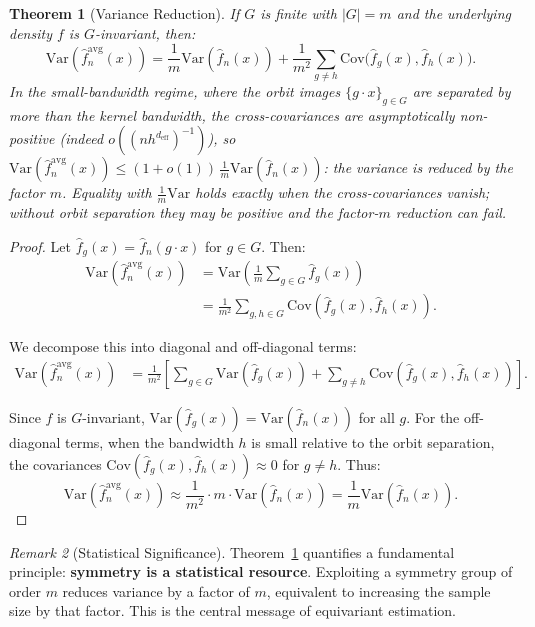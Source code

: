 \documentclass[11pt,twoside,openright]{book}
\theoremstyle{plain}
\newtheorem{theorem}{Theorem}[chapter]
\theoremstyle{definition}
\theoremstyle{remark}
\newtheorem{remark}[theorem]{Remark}
\newcommand{\var}{\mathrm{Var}}
\newcommand{\Cov}{\mathrm{Cov}}
\newcommand{\deff}{d_{\mathrm{eff}}}
\begin{document}
\begin{theorem}[Variance Reduction]
\label{thm:variance-reduction}
If $G$ is finite with $|G| = m$ and the underlying density $f$ is $G$-invariant, then:
\begin{equation}
\var(\hat{f}_n^{\text{avg}}(x)) = \frac{1}{m} \var(\hat{f}_n(x)) + \frac{1}{m^2}\sum_{g\neq h}\Cov\big(\hat{f}_g(x),\hat{f}_h(x)\big).
\label{eq:variance-reduction}
\end{equation}
In the small-bandwidth regime, where the orbit images $\{g\cdot x\}_{g\in G}$ are separated by more than the kernel bandwidth, the cross-covariances are asymptotically non-positive (indeed $o((nh^{\deff})^{-1})$), so $\var(\hat{f}_n^{\text{avg}}(x)) \le (1+o(1))\,\tfrac{1}{m}\var(\hat{f}_n(x))$: the variance is reduced by the factor $m$. Equality with $\tfrac1m\var$ holds exactly when the cross-covariances vanish; \emph{without} orbit separation they may be positive and the factor-$m$ reduction can fail.
\end{theorem}

\begin{proof}
Let $\hat{f}_g(x) = \hat{f}_n(g \cdot x)$ for $g \in G$. Then:
\begin{align}
\var(\hat{f}_n^{\text{avg}}(x)) &= \var\left(\frac{1}{m} \sum_{g \in G} \hat{f}_g(x)\right) \\
&= \frac{1}{m^2} \sum_{g, h \in G} \Cov(\hat{f}_g(x), \hat{f}_h(x)).
\end{align}

We decompose this into diagonal and off-diagonal terms:
\begin{align}
\var(\hat{f}_n^{\text{avg}}(x)) &= \frac{1}{m^2} \left[ \sum_{g \in G} \var(\hat{f}_g(x)) + \sum_{g \neq h} \Cov(\hat{f}_g(x), \hat{f}_h(x)) \right].
\end{align}

Since $f$ is $G$-invariant, $\var(\hat{f}_g(x)) = \var(\hat{f}_n(x))$ for all $g$. For the off-diagonal terms, when the bandwidth $h$ is small relative to the orbit separation, the covariances $\Cov(\hat{f}_g(x), \hat{f}_h(x)) \approx 0$ for $g \neq h$. Thus:
\[
\var(\hat{f}_n^{\text{avg}}(x)) \approx \frac{1}{m^2} \cdot m \cdot \var(\hat{f}_n(x)) = \frac{1}{m} \var(\hat{f}_n(x)).
\]
\end{proof}

\begin{remark}[Statistical Significance]
\label{rem:symmetry-resource}
Theorem~\ref{thm:variance-reduction} quantifies a fundamental principle: \textbf{symmetry is a statistical resource}. Exploiting a symmetry group of order $m$ reduces variance by a factor of $m$, equivalent to increasing the sample size by that factor. This is the central message of equivariant estimation.
\end{remark}
\end{document}
